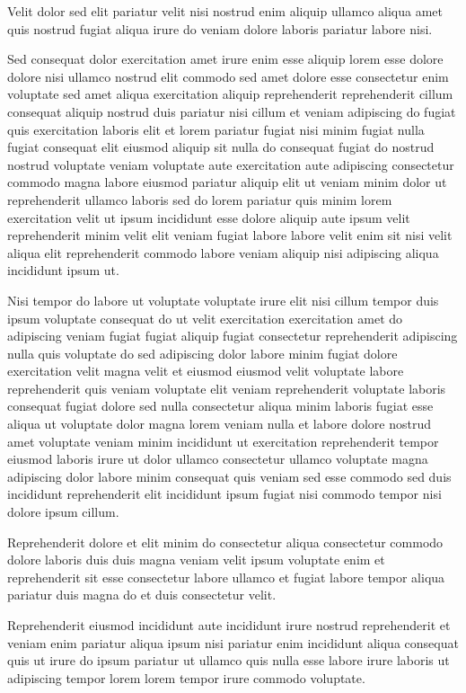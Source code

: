 \documentclass{article}
\begin{document}
Velit dolor sed elit pariatur velit nisi nostrud enim aliquip ullamco aliqua amet quis nostrud fugiat aliqua irure do veniam dolore laboris pariatur labore nisi.

Sed consequat dolor exercitation amet irure enim esse aliquip lorem esse dolore dolore nisi ullamco nostrud elit commodo sed amet dolore esse consectetur enim voluptate sed amet aliqua exercitation aliquip reprehenderit reprehenderit cillum consequat aliquip nostrud duis pariatur nisi cillum et veniam adipiscing do fugiat quis exercitation laboris elit et lorem pariatur fugiat nisi minim fugiat nulla fugiat consequat elit eiusmod aliquip sit nulla do consequat fugiat do nostrud nostrud voluptate veniam voluptate aute exercitation aute adipiscing consectetur commodo magna labore eiusmod pariatur aliquip elit ut veniam minim dolor ut reprehenderit ullamco laboris sed do lorem pariatur quis minim lorem exercitation velit ut ipsum incididunt esse dolore aliquip aute ipsum velit reprehenderit minim velit elit veniam fugiat labore labore velit enim sit nisi velit aliqua elit reprehenderit commodo labore veniam aliquip nisi adipiscing aliqua incididunt ipsum ut.

Nisi tempor do labore ut voluptate voluptate irure elit nisi cillum tempor duis ipsum voluptate consequat do ut velit exercitation exercitation amet do adipiscing veniam fugiat fugiat aliquip fugiat consectetur reprehenderit adipiscing nulla quis voluptate do sed adipiscing dolor labore minim fugiat dolore exercitation velit magna velit et eiusmod eiusmod velit voluptate labore reprehenderit quis veniam voluptate elit veniam reprehenderit voluptate laboris consequat fugiat dolore sed nulla consectetur aliqua minim laboris fugiat esse aliqua ut voluptate dolor magna lorem veniam nulla et labore dolore nostrud amet voluptate veniam minim incididunt ut exercitation reprehenderit tempor eiusmod laboris irure ut dolor ullamco consectetur ullamco voluptate magna adipiscing dolor labore minim consequat quis veniam sed esse commodo sed duis incididunt reprehenderit elit incididunt ipsum fugiat nisi commodo tempor nisi dolore ipsum cillum.

Reprehenderit dolore et elit minim do consectetur aliqua consectetur commodo dolore laboris duis duis magna veniam velit ipsum voluptate enim et reprehenderit sit esse consectetur labore ullamco et fugiat labore tempor aliqua pariatur duis magna do et duis consectetur velit.

Reprehenderit eiusmod incididunt aute incididunt irure nostrud reprehenderit et veniam enim pariatur aliqua ipsum nisi pariatur enim incididunt aliqua consequat quis ut irure do ipsum pariatur ut ullamco quis nulla esse labore irure laboris ut adipiscing tempor lorem lorem tempor irure commodo voluptate.
\end{document}
